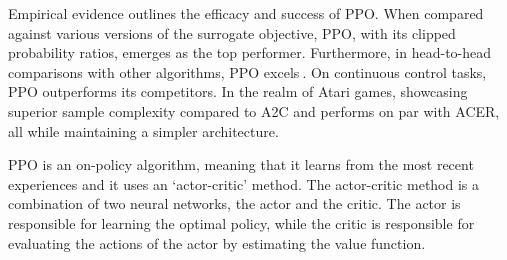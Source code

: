 Empirical evidence outlines the efficacy and success of PPO. When compared against various versions of the surrogate objective, PPO, with its clipped probability ratios, emerges as the top performer. Furthermore, in head-to-head comparisons with other algorithms, PPO excels$~$\cite{Larsen2021Comparing}. On continuous control tasks, PPO outperforms its competitors. In the realm of Atari games, showcasing superior sample complexity compared to A2C and performs on par with ACER, all while maintaining a simpler architecture.

PPO is an on-policy algorithm, meaning that it learns from the most recent experiences and it uses an `actor-critic' method. The actor-critic method is a combination of two neural networks, the actor and the critic. The actor is responsible for learning the optimal policy, while the critic is responsible for evaluating the actions of the actor by estimating the value function.  

